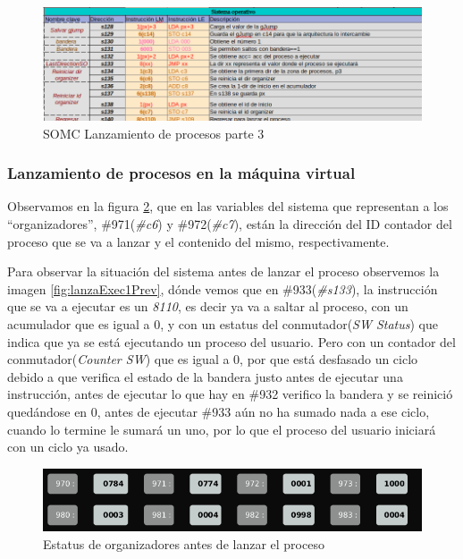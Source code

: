 \documentclass[letterpaper,12pt,oneside]{book}
\begin{document}
		\begin{figure}[h]		
			\centering
			\includegraphics[scale=0.53]{media/CARDIACC/SO_EjecutarProceso3.png}
			\caption{ SOMC Lanzamiento de procesos parte 3 }
			\label{fig:somcLanzamientoP3}
		\end{figure}

		\subsubsection{Lanzamiento de procesos en la máquina virtual}		
		
		Observamos 
		en la figura \ref{fig:varSisStatExec1}, que en
		las variables del sistema que representan a los ``organizadores'', \#971(\textit{\#c6}) y \#972(\textit{\#c7}), están la dirección del ID contador del proceso que se va
		a lanzar y el contenido del mismo, respectivamente.
		
		Para observar la situación del sistema antes de lanzar el proceso observemos la imagen \ref{fig:lanzaExec1Prev},
		dónde vemos que en \#933(\textit{\#s133}), la instrucción que se va a ejecutar es un \textit{8110}, es decir ya va a saltar al proceso, con un acumulador que es igual a 0,
		y con un estatus del conmutador(\textit{SW Status}) que indica que ya se está ejecutando un proceso del usuario. Pero con un contador del conmutador(\textit{Counter SW}) que es igual a 0, por
		que está desfasado un ciclo debido a que verifica el estado de la bandera justo antes de ejecutar una instrucción, antes de ejecutar lo que hay
		en \#932 verifico la bandera y se reinició quedándose en 0, antes de ejecutar  \#933 aún no ha sumado nada a ese ciclo, cuando lo termine le 
		sumará un uno, por lo que el proceso del usuario iniciará con un ciclo ya usado.
	


		\begin{figure}[h]		
			\centering
			\includegraphics[scale=0.65]{media/CARDIACC/VariablesSistemaEstatusExec1.png}
			\caption{ Estatus de organizadores antes de lanzar el proceso}
			\label{fig:varSisStatExec1}
		\end{figure}		
		
\end{document}
